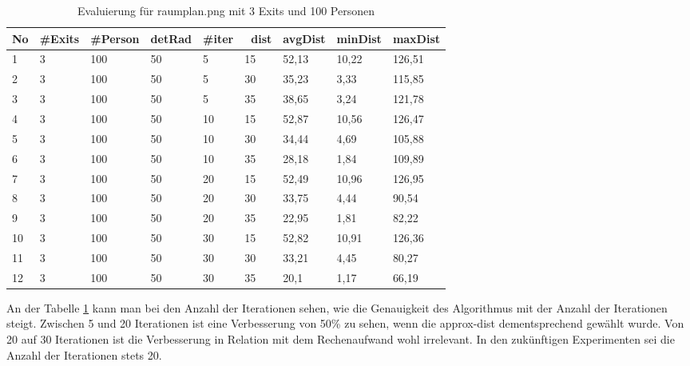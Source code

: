 \begin{table}[h]
\begin{tabular}{|l|l|l|l|l|l|l|l|l|}
\hline
No & \#Exits & \#Person & detRad & \#iter & ~dist & avgDist & minDist & maxDist \\ \hline
1  & 3       & 100      & 50     & 5      & 15    & 52,13   & 10,22   & 126,51  \\ \hline
2  & 3       & 100      & 50     & 5      & 30    & 35,23   & 3,33    & 115,85  \\ \hline
3  & 3       & 100      & 50     & 5      & 35    & 38,65   & 3,24    & 121,78  \\ \hline
4  & 3       & 100      & 50     & 10     & 15    & 52,87   & 10,56   & 126,47  \\ \hline
5  & 3       & 100      & 50     & 10     & 30    & 34,44   & 4,69    & 105,88  \\ \hline
6  & 3       & 100      & 50     & 10     & 35    & 28,18   & 1,84    & 109,89  \\ \hline
7  & 3       & 100      & 50     & 20     & 15    & 52,49   & 10,96   & 126,95  \\ \hline
8  & 3       & 100      & 50     & 20     & 30    & 33,75   & 4,44    & 90,54   \\ \hline
9  & 3       & 100      & 50     & 20     & 35    & 22,95   & 1,81    & 82,22   \\ \hline
10 & 3       & 100      & 50     & 30     & 15    & 52,82   & 10,91   & 126,36  \\ \hline
11 & 3       & 100      & 50     & 30     & 30    & 33,21   & 4,45    & 80,27   \\ \hline
12 & 3       & 100      & 50     & 30     & 35    & 20,1    & 1,17    & 66,19   \\ \hline
\end{tabular}
\caption{Evaluierung für raumplan.png mit 3 Exits und 100 Personen}
\label{fig:eva01}
\end{table}

An der Tabelle \ref{fig:eva01} kann man bei den Anzahl der Iterationen sehen, wie die Genauigkeit des Algorithmus mit der Anzahl der Iterationen steigt. Zwischen 5 und 20 Iterationen ist eine Verbesserung von 50\% zu sehen, wenn die approx-dist dementsprechend gewählt wurde. Von 20 auf 30 Iterationen ist die Verbesserung in Relation mit dem Rechenaufwand wohl irrelevant. In den zukünftigen Experimenten sei die Anzahl der Iterationen stets 20.



